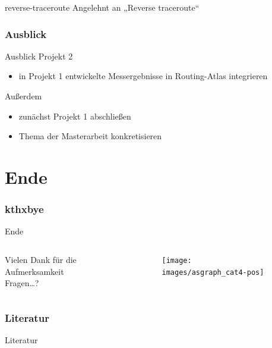\documentclass[ngerman,compress,hyperref={bookmarks}]{beamer}
\begin{document}
\begin{frame}{reverse-traceroute}
  Angelehnt an „Reverse traceroute“ \cite{Katz-Bassett:2010:RT:1855711.1855726}
\end{frame}

\section{Ausblick}
\begin{frame}{Ausblick}
  Projekt 2
  \begin{itemize}
    \item in Projekt 1 entwickelte Messergebnisse in Routing-Atlas integrieren
  \end{itemize}
  \vspace{0.3cm}
  Außerdem
  \begin{itemize}
    \item zunächst Projekt 1 abschließen
    \item Thema der Masterarbeit konkretisieren
  \end{itemize}
\end{frame}

\part{Ende}
\section{kthxbye}
\begin{frame}[plain]{Ende}
\begin{columns}[t]
\begin{column}{0.5\textwidth}
 \begin{center}
 \vspace{1cm}
 Vielen Dank für die Aufmerksamkeit\\
 \vspace{1.5cm}
 Fragen\ldots?
 \end{center}
\end{column}
\begin{column}{0.5\textwidth}
 \vspace{-1cm}
 \begin{figure}
  \label{asngraphs2}
  \texttt{[image: images/asgraph\_cat4-pos]}
 \end{figure}
\end{column}
\end{columns}
\end{frame}

\section{Literatur}
\begin{frame}{Literatur}
\scriptsize


\end{frame}
\end{document}

